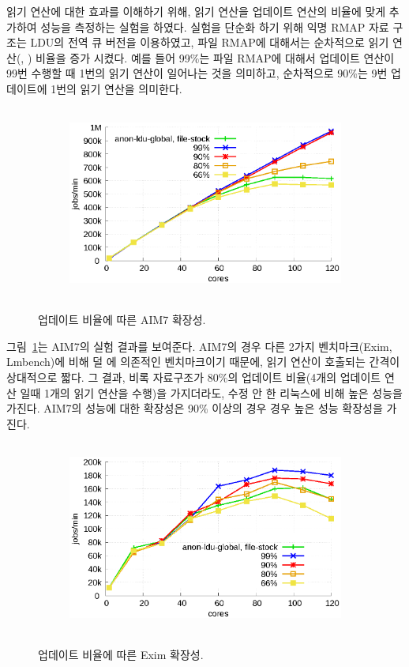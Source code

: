 읽기 연산에 대한 효과를 이해하기 위해, 읽기 연산을 업데이트 연산의 비율에 
맞게 추가하여 성능을 측정하는 실험을 하였다.
실험을 단순화 하기 위해 익명 RMAP 자료 구조는 LDU의 전역 큐 버전을 이용하였고, 
파일 RMAP에 대해서는 순차적으로 읽기 연산(, ) 비율을 증가 시켰다.
예를 들어 99\%는 파일 RMAP에 대해서 업데이트 연산이 99번 수행할 때 1번의 읽기 연산이 
일어나는 것을 의미하고, 순차적으로 90\%는 9번 업데이트에 1번의 읽기 연산을 의미한다.

\begin{figure}[h!]
    \centering
    \begin{subfigure}[b]{1\textwidth}
        \includegraphics[height=2.5in]{graph/ratio_aim7_core.eps}
    \end{subfigure}%
    \caption{업데이트 비율에 따른 AIM7 확장성.}
    \label{fig:UpdateRate_aim7_2}
\end{figure}
 
 
그림~\ref{fig:UpdateRate_aim7_2}는 AIM7의 실험 결과를 보여준다.
AIM7의 경우 다른 2가지 벤치마크(Exim, Lmbench)에 비해 덜 에 의존적인 
벤치마크이기 때문에, 읽기 연산이 호출되는 간격이 상대적으로 짧다.
그 결과, 비록 자료구조가 80\%의 업데이트 비율(4개의 업데이트 연산 일때 1개의 읽기 연산을 수행)을 
가지더라도, 수정 안 한 리눅스에 비해 높은 성능을 가진다. 
AIM7의 성능에 대한 확장성은 90\% 이상의 경우 경우 높은 성능 확장성을 가진다.
 
\begin{figure}[h!]
    \centering
    \begin{subfigure}[b]{1\textwidth}
        \includegraphics[height=2.5in]{graph/ratio_exim_core.eps}
    \end{subfigure}%
    \caption{업데이트 비율에 따른 Exim 확장성.}
    \label{fig:UpdateRate_exim_2}
\end{figure}


